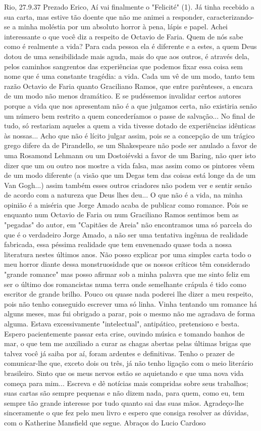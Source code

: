 Rio, 27.9.37
Prezado Erico,
Aí vai finalmente o "Felicité" (1).
Já tinha recebido a sua carta, mas estive tão doente que não me animei a responder, caracterizando-se a minha moléstia por um absoluto horror à pena, lápis e papel.
Achei interessante o que você diz a respeito de Octavio de Faria. Quem de nós sabe como é realmente a vida? Para cada pessoa ela é diferente e a estes, a quem Deus dotou de uma sensibilidade mais aguda, mais do que aos outros, é através dela, pelos caminhos sangrentos das experiências que podemos fixar essa coisa sem nome que é uma constante tragédia: a vida. Cada um vê de um modo, tanto tem razão Octavio de Faria quanto Graciliano Ramos, que entre parênteses, a encara de um modo não menos dramático.
E se pudéssemos invalidar certos autores porque a vida que nos apresentam não é a que julgamos certa, não existiria senão um número bem restrito a quem concederíamos o passe de salvação... No final de tudo, só restariam aqueles a quem a vida tivesse dotado de experiências idênticas às nossas...
Acho que não é lícito julgar assim, pois se a concepção de um trágico grego difere da de Pirandello, se um Shakespeare não pode ser anulado a favor de uma Rosamond Lehmann ou um Dostoiévski a favor de um Baring, não quer isto dizer que um ou outro nos mostre a vida falsa, mas assim como os pintores vêem de um modo diferente (a visão que um Degas tem das coisas está longe da de um Van Gogh...) assim também esses outros criadores não podem ver e sentir senão de acordo com a natureza que Deus lhes deu...
O que não é a vida, na minha opinião é a miséria que Jorge Amado acaba de publicar como romance. Pois se enquanto num Octavio de Faria ou num Graciliano Ramos sentimos bem as "pegadas" do autor, em "Capitães de Areia" não encontramos uma só parcela do que é o verdadeiro Jorge Amado, a não ser uma tentativa ingênua de realidade fabricada, essa péssima realidade que tem envenenado quase toda a nossa literatura nestes últimos anos.
Não posso explicar por uma simples carta todo o meu horror diante dessa monstruosidade que os nossos críticos têm considerado "grande romance" mas posso afirmar sob a minha palavra que me sinto feliz em ser o último dos romancistas numa terra onde semelhante crápula é tido como escritor de grande brilho.
Pouco ou quase nada poderei lhe dizer a meu respeito, pois não tenho conseguido escrever uma só linha. Vinha tentando um romance há alguns meses, mas fui obrigado a parar, pois o mesmo não me agradava de forma alguma. Estava excessivamente "intelectual", antipático, pretensioso e besta.
Espero pacientemente passar esta crise, ouvindo música e tomando banhos de mar, o que tem me auxiliado a curar as chagas abertas pelas últimas brigas que talvez você já saiba por aí, foram ardentes e definitivas.
Tenho o prazer de comunicar-lhe que, exceto dois ou três, já não tenho ligação com o meio literário brasileiro. Sinto que os meus nervos estão se aquietando e que uma nova vida começa para mim...
Escreva e dê notícias mais compridas sobre seus trabalhos; suas cartas são sempre pequenas e não dizem nada, para quem, como eu, tem sempre tão grande interesse por tudo quanto sai das suas mãos.
Agradeço-lhe sinceramente o que fez pelo meu livro e espero que consiga resolver as dúvidas, com o Katherine Mansfield que segue. Abraços do
Lucio Cardoso

